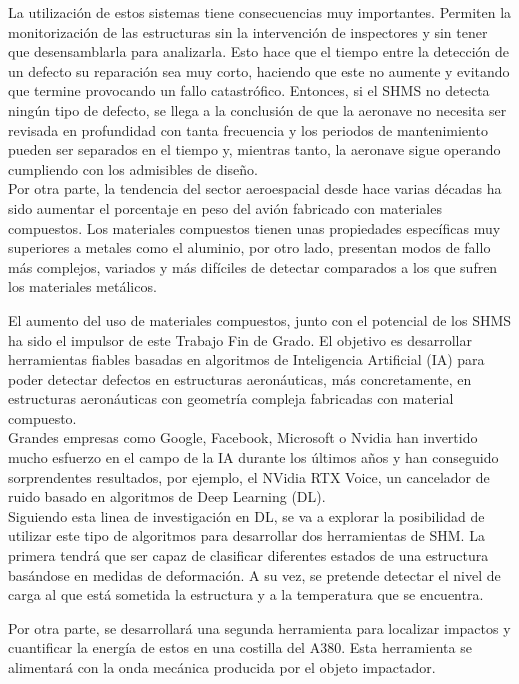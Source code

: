 La utilización de estos sistemas tiene consecuencias muy importantes. Permiten la monitorización de las estructuras sin la intervención de inspectores y sin tener que desensamblarla para analizarla. Esto hace que el tiempo entre la detección de un defecto su reparación sea muy corto, haciendo que este no aumente y evitando que termine provocando un fallo catastrófico. Entonces, si el SHMS no detecta ningún tipo de defecto, se llega a la conclusión de que la aeronave no necesita ser revisada en profundidad con tanta frecuencia y los periodos de mantenimiento pueden ser separados en el tiempo y, mientras tanto, la aeronave sigue operando cumpliendo con los admisibles de diseño.\\

Por otra parte, la tendencia del sector aeroespacial desde hace varias décadas ha sido aumentar el porcentaje en peso del avión fabricado con materiales compuestos. Los materiales compuestos tienen unas propiedades específicas muy superiores a metales como el aluminio, por otro lado, presentan modos de fallo más complejos, variados y más difíciles de detectar comparados a los que sufren los materiales metálicos.

El aumento del uso de materiales compuestos, junto con el potencial de los SHMS ha sido el impulsor de este Trabajo Fin de Grado. El objetivo es desarrollar herramientas fiables basadas en algoritmos de Inteligencia Artificial (IA) para poder detectar defectos en estructuras aeronáuticas, más concretamente, en estructuras aeronáuticas con geometría compleja fabricadas con material compuesto.\\
 
Grandes empresas como Google, Facebook, Microsoft o Nvidia han invertido mucho esfuerzo en el campo de la IA durante los últimos años y han conseguido sorprendentes resultados, por ejemplo, el NVidia RTX Voice, un cancelador de ruido basado en algoritmos de Deep Learning (DL).\\

Siguiendo esta linea de investigación en DL, se va a explorar la posibilidad de utilizar este tipo de algoritmos para desarrollar dos herramientas de SHM. La primera tendrá que ser capaz de clasificar diferentes estados de una estructura basándose en medidas de deformación. A su vez, se pretende detectar el nivel de carga al que está sometida la estructura y a la temperatura que se encuentra.

Por otra parte, se desarrollará una segunda herramienta para localizar impactos y cuantificar la energía de estos en una costilla del A380. Esta herramienta se alimentará con la onda mecánica producida por el objeto impactador.\\

